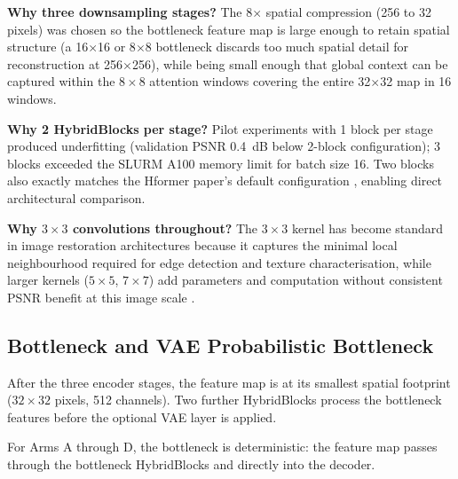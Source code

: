 \documentclass[12pt, a4paper, twoside, openright]{book}
\begin{document}
\textbf{Why three downsampling stages?} The 8$\times$ spatial compression (256 to 32 pixels) was chosen so the bottleneck feature map is large enough to retain spatial structure (a 16$\times$16 or 8$\times$8 bottleneck discards too much spatial detail for reconstruction at 256$\times$256), while being small enough that global context can be captured within the $8\times8$ attention windows covering the entire 32$\times$32 map in 16 windows.

\textbf{Why 2 HybridBlocks per stage?} Pilot experiments with 1 block per stage produced underfitting (validation PSNR 0.4~dB below 2-block configuration); 3 blocks exceeded the SLURM A100 memory limit for batch size 16. Two blocks also exactly matches the Hformer paper's default configuration \cite{zhang_hformer_2023}, enabling direct architectural comparison.

\textbf{Why $3\times3$ convolutions throughout?} The $3\times3$ kernel has become standard in image restoration architectures because it captures the minimal local neighbourhood required for edge detection and texture characterisation, while larger kernels ($5\times5$, $7\times7$) add parameters and computation without consistent PSNR benefit at this image scale \cite{zhang_beyond_2017, zhang_drunet_2021}.

\subsection{Bottleneck and VAE Probabilistic Bottleneck}
\label{sec:methods:architecture:bottleneck}

After the three encoder stages, the feature map is at its smallest spatial footprint
($32 \times 32$ pixels, 512 channels). Two further HybridBlocks process the bottleneck
features before the optional VAE layer is applied.

For Arms A through D, the bottleneck is deterministic: the feature
map passes through the bottleneck HybridBlocks and directly into the decoder.
\end{document}
